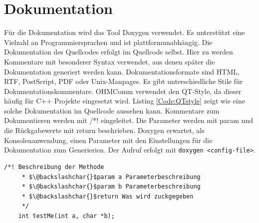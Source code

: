 \section{Dokumentation}
Für die Dokumentation wird das Tool Doxygen verwendet. Es unterstützt eine Vielzahl an Programmiersprachen und ist plattformunabhängig. Die Dokumentation des Quellcodes erfolgt im Quellcode selbst. Hier zu werden Kommentare mit besonderer Syntax verwendet, aus denen später die Dokumentation generiert werden kann. Dokumentationsformate sind HTML, RTF, PostScript, PDF oder Unix-Manpages. Es gibt unterschiedliche Stile für Dokumentationskommentare. OHMComm verwendet den QT-Style, da dieser häufig für C++ Projekte eingesetzt wird. Listing \ref{Code:QTstyle} zeigt wie eine solche Dokumentation im Quellcode aussehen kann. Kommentare zum Dokumentieren werden mit /*! eingeleitet. Die Parameter werden mit \/param und die Rückgabewerte mit \/return beschrieben. Doxygen erwartet, als Konsolenanwendung, einen Parameter mit den Einstellungen für die Dokumentation zum Generierien. Der Aufruf erfolgt mit \texttt{doxygen <config-file>}.

\begin{lstlisting}[caption={Code-Dokumentation im QT-Style},label={Code:QTstyle}, numbers=none]
	/*! Beschreibung der Methode
	 * $\@backslashchar{}$param a Parameterbeschreibung
	 * $\@backslashchar{}$param b Parameterbeschreibung
	 * $\@backslashchar{}$return Was wird zuckgegeben
	 */ 
	int testMe(int a, char *b);
\end{lstlisting}